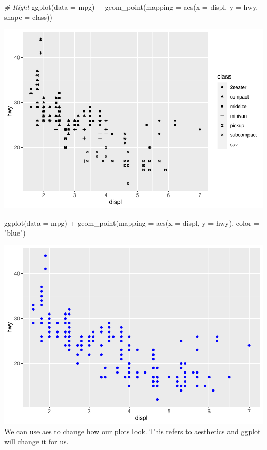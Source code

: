 \documentclass[
]{article}
\newenvironment{Shaded}{\begin{snugshade}}{\end{snugshade}}
\newcommand{\AttributeTok}[1]{\textcolor[rgb]{0.77,0.63,0.00}{#1}}
\newcommand{\CommentTok}[1]{\textcolor[rgb]{0.56,0.35,0.01}{\textit{#1}}}
\newcommand{\FunctionTok}[1]{\textcolor[rgb]{0.00,0.00,0.00}{#1}}
\newcommand{\NormalTok}[1]{#1}
\newcommand{\SpecialCharTok}[1]{\textcolor[rgb]{0.00,0.00,0.00}{#1}}
\newcommand{\StringTok}[1]{\textcolor[rgb]{0.31,0.60,0.02}{#1}}
\begin{document}
\begin{Shaded}
\begin{Highlighting}[]
\CommentTok{\# Right}
\FunctionTok{ggplot}\NormalTok{(}\AttributeTok{data =}\NormalTok{ mpg) }\SpecialCharTok{+} 
  \FunctionTok{geom\_point}\NormalTok{(}\AttributeTok{mapping =} \FunctionTok{aes}\NormalTok{(}\AttributeTok{x =}\NormalTok{ displ, }\AttributeTok{y =}\NormalTok{ hwy, }\AttributeTok{shape =}\NormalTok{ class))}
\end{Highlighting}
\end{Shaded}

\includegraphics{Journal_files/figure-latex/unnamed-chunk-45-4.pdf}

\begin{Shaded}
\begin{Highlighting}[]
\FunctionTok{ggplot}\NormalTok{(}\AttributeTok{data =}\NormalTok{ mpg) }\SpecialCharTok{+} 
  \FunctionTok{geom\_point}\NormalTok{(}\AttributeTok{mapping =} \FunctionTok{aes}\NormalTok{(}\AttributeTok{x =}\NormalTok{ displ, }\AttributeTok{y =}\NormalTok{ hwy), }\AttributeTok{color =} \StringTok{"blue"}\NormalTok{)}
\end{Highlighting}
\end{Shaded}

\includegraphics{Journal_files/figure-latex/unnamed-chunk-45-5.pdf} We
can use aes to change how our plots look. This refers to aesthetics and
ggplot will change it for us.
\end{document}
